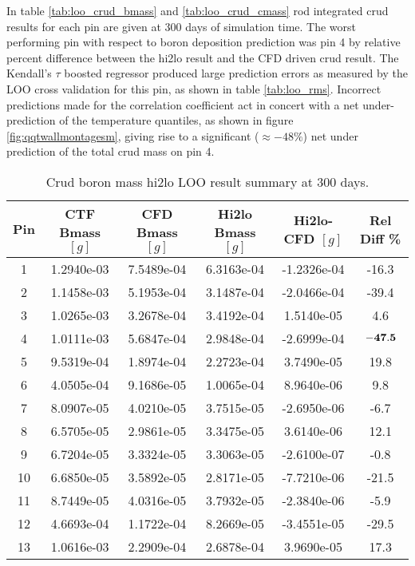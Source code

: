 In table \ref{tab:loo_crud_bmass} and \ref{tab:loo_crud_cmass} rod integrated crud results for each pin are given at 300 days of simulation time.  The worst performing pin with respect to boron deposition prediction was pin 4 by relative percent difference between the hi2lo result and the CFD driven crud result.  The Kendall's $\tau$ boosted regressor produced large prediction errors as measured by the LOO cross validation for this pin, as shown in table \ref{tab:loo_rms}.  Incorrect predictions made for the correlation coefficient act in concert with a net under-prediction of the temperature quantiles, as shown in figure \ref{fig:qqtwallmontagesm}, giving rise to a significant ($\approx -48\%$) net under prediction of the total crud mass on pin 4.


\begin{table}[h]
    \begin{center}
    \caption[Hi2lo crud boron mass results]{Crud boron mass hi2lo LOO result summary at 300 days.}
    \begin{tabular}[h]{|c|c|c|c|c|c|}
        \hline
        Pin & CTF Bmass $[g]$ & CFD Bmass $[g]$ & Hi2lo Bmass $[g]$ & Hi2lo-CFD $[g]$ & Rel Diff \% \\
\hline
1  & 1.2940e-03 & 7.5489e-04 & 6.3163e-04 & -1.2326e-04 &  -16.3 \\
2  & 1.1458e-03 & 5.1953e-04 & 3.1487e-04 & -2.0466e-04 &  -39.4 \\
3  & 1.0265e-03 & 3.2678e-04 & 3.4192e-04 & 1.5140e-05 &  4.6 \\ 
4  & 1.0111e-03 & 5.6847e-04 & 2.9848e-04 & -2.6999e-04 &  $\bf{-47.5}$ \\
5  & 9.5319e-04 & 1.8974e-04 & 2.2723e-04 & 3.7490e-05 &  19.8 \\ 
6  & 4.0505e-04 & 9.1686e-05 & 1.0065e-04 & 8.9640e-06 &  9.8 \\ 
7  & 8.0907e-05 & 4.0210e-05 & 3.7515e-05 & -2.6950e-06 &  -6.7 \\
8  & 6.5705e-05 & 2.9861e-05 & 3.3475e-05 & 3.6140e-06 &  12.1 \\ 
9  & 6.7204e-05 & 3.3324e-05 & 3.3063e-05 & -2.6100e-07 &  -0.8 \\
10  &6.6850e-05 & 3.5892e-05 & 2.8171e-05 & -7.7210e-06 &  -21.5 \\
11  &8.7449e-05 & 4.0316e-05 & 3.7932e-05 & -2.3840e-06 &  -5.9 \\
12  &4.6693e-04 & 1.1722e-04 & 8.2669e-05 & -3.4551e-05 &  -29.5 \\
13  &1.0616e-03 & 2.2909e-04 & 2.6878e-04 & 3.9690e-05 &  17.3 \\ 

\end{tabular}
\end{center}
\end{table}
